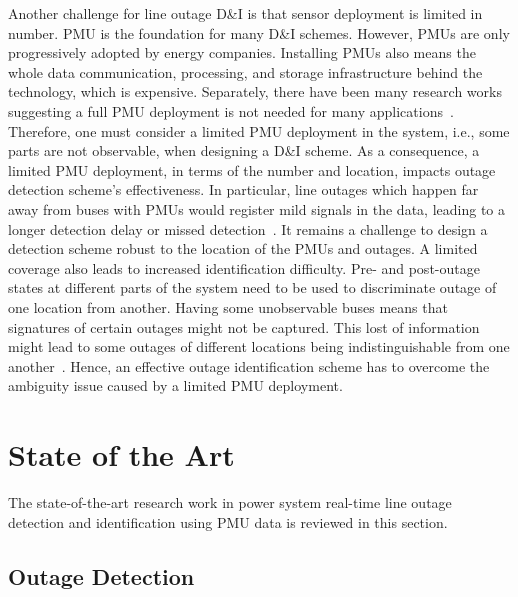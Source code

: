 Another challenge for line outage D\&I is that sensor deployment is limited in number. 
PMU is the foundation for many D\&I schemes. However, PMUs are only progressively adopted by energy companies. Installing PMUs also means the whole data communication, processing, and storage infrastructure behind the technology, which is expensive. Separately, there have been many research works suggesting a full PMU deployment is not needed for many applications~\cite{aminifar2014synchrophasor}. Therefore, one must consider a limited PMU deployment in the system, i.e., some parts are not observable, when designing a D\&I scheme.
As a consequence, a limited PMU deployment, in terms of the number and location, impacts outage detection scheme's effectiveness. In particular, line outages which happen far away from buses with PMUs would register mild signals in the data, leading to a longer detection delay or missed detection~\cite{yang2020control}. It remains a challenge to design a detection scheme robust to the location of the PMUs and outages.
A limited coverage also leads to increased identification difficulty. Pre- and post-outage states at different parts of the system need to be used to discriminate outage of one location from another. Having some unobservable buses means that signatures of certain outages might not be captured. This lost of information might lead to some outages of different locations being indistinguishable from one another~\cite{Wu2015,Costilla-Enriquez2019,yang2021particle}. Hence, an effective outage identification scheme has to overcome the ambiguity issue caused by a limited PMU deployment. 



\section{State of the Art}

The state-of-the-art research work in power system real-time line outage detection and identification using PMU data is reviewed in this section. 

\subsection{Outage Detection} %
\label{sub:outage_detection}

